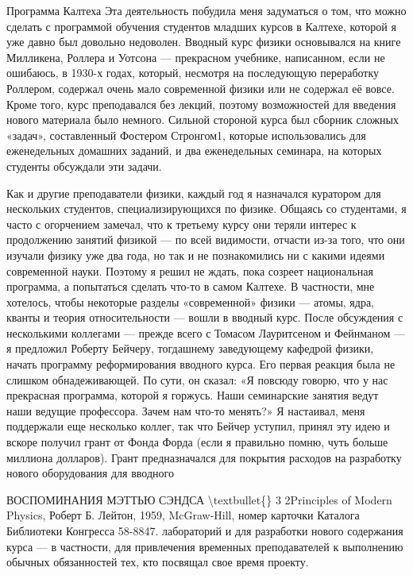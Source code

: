 \documentclass[10pt,oneside]{article}
\begin{document}
Программа Калтеха Эта деятельность побудила меня задуматься о том, что можно сделать с программой обучения студентов младших курсов в Калтехе, которой я уже давно был довольно недоволен. Вводный курс физики основывался на книге Милликена, Роллера и Уотсона --- прекрасном учебнике, написанном, если не ошибаюсь, в 1930-х годах, который, несмотря на последующую переработку Роллером, содержал очень мало современной физики или не содержал её вовсе. Кроме того, курс преподавался без лекций, поэтому возможностей для введения нового материала было немного. Сильной стороной курса был сборник сложных «задач», составленный Фостером Стронгом1, которые использовались для еженедельных домашних заданий, и два еженедельных семинара, на которых студенты обсуждали эти задачи.\par

Как и другие преподаватели физики, каждый год я назначался куратором для нескольких студентов, специализирующихся по физике. Общаясь со студентами, я часто с огорчением замечал, что к третьему курсу они теряли интерес к продолжению занятий физикой --- по всей видимости, отчасти из-за того, что они изучали физику уже два года, но так и не познакомились ни с какими идеями современной науки. Поэтому я решил не ждать, пока созреет национальная программа, а попытаться сделать что-то в самом Калтехе. В частности, мне хотелось, чтобы некоторые разделы «современной» физики --- атомы, ядра, кванты и теория относительности --- вошли в вводный курс. После обсуждения с несколькими коллегами --- прежде всего с Томасом Лауритсеном и Фейнманом --- я предложил Роберту Бейчеру, тогдашнему заведующему кафедрой физики, начать программу реформирования вводного курса. Его первая реакция была не слишком обнадеживающей. По сути, он сказал: «Я повсюду говорю, что у нас прекрасная программа, которой я горжусь. Наши семинарские занятия ведут наши ведущие профессора. Зачем нам что-то менять?» Я настаивал, меня поддержали еще несколько коллег, так что Бейчер уступил, принял эту идею и вскоре получил грант от Фонда Форда (если я правильно помню, чуть больше миллиона долларов). Грант предназначался для покрытия расходов на разработку нового оборудования для вводного\par

ВОСПОМИНАНИЯ МЭТТЬЮ СЭНДСА \textbackslash{}textbullet\{\} 3 2Principles of Modern Physics, Роберт Б. Лейтон, 1959, McGraw-Hill, номер карточки Каталога Библиотеки Конгресса 58-8847. лабораторий и для разработки нового содержания курса --- в частности, для привлечения временных преподавателей к выполнению обычных обязанностей тех, кто посвящал свое время проекту.\par
\end{document}
